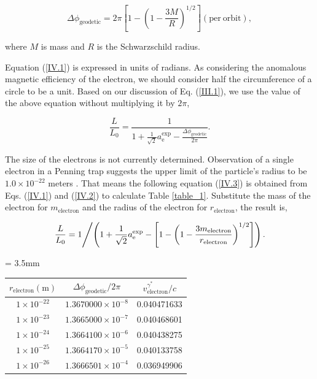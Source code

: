 \documentclass[10.5pt]{article}
\numberwithin{equation}{section}
\begin{document}
\begin{equation}
    \Delta \phi_{\mathrm{geodetic}} = 2 \pi \left[ 1 - \left( 1 - \frac{3M}{R} \right)^{1/2} \right] \mathrm{(per \ orbit)},
    \label{IV.1}
\end{equation}

\noindent where $M$ is mass and $R$ is the Schwarzschild radius.


Equation (\ref{IV.1}) is expressed in units of radians. As considering the anomalous magnetic efficiency of the electron, we should consider half the circumference of a circle to be a unit. Based on our discussion of Eq. (\ref{III.1}), we use the value of the above equation without multiplying it by $2 \pi$,

\begin{equation}
    \frac{L}{L_0} = \frac{1}{1 + \frac{1}{\sqrt{2}}a^{\text{exp}}_{\text{e}} - \frac{\Delta \phi_{\mathrm{geodetic}}}{2 \pi}} .
    \label{IV.2}
\end{equation}


The size of the electrons is not currently determined. Observation of a single electron in a Penning trap suggests the upper limit of the particle's radius to be $1.0 \times 10^{-22}$ meters \cite{Dehmelt}. That means the following equation (\ref{IV.3}) is obtained from Eqs. (\ref{IV.1}) and (\ref{IV.2}) to calculate Table \ref{table_1}.  Substitute the mass of the electron for $m_{\mathrm{electron}}$ and the radius of the electron for $r_{\mathrm{electron}}$, the result is,

\begin{equation}
    \left.
    \frac{L}{L_0} = 1
    \middle/
    \left( {1 + \frac{1}{\sqrt{2}}a^{\text{exp}}_{\text{e}} - \left[ 1 - \left( 1 - \frac{3 m_{\mathrm{electron}}}{r_{\mathrm{electron}}} \right)^{1/2} \right]} \right).
    \right.
    \label{IV.3}
\end{equation}

\begin{center}
    \begin{threeparttable}
        \caption{The velocity and the radius of an electron}
        \label{table_1}
        \tabcolsep = 3.5mm
        \renewcommand\arraystretch{1.2}
        \begin{tabular}{ccc}
            \hline
        $ r_{\mathrm{electron}} {\mathrm{(m)}}$ & $\Delta \phi_{\mathrm{geodetic}}/{2 \pi}$ & $ v_{\text{electron}}^{\gamma^{*}} / c$ \\       \hline
        $1 \times 10^{-22}$ & $1.3670000 \times 10^{-8}$ & 0.040471633 \\ 
        $1 \times 10^{-23}$ & $1.3665000 \times 10^{-7}$ & 0.040468601 \\ 
        $1 \times 10^{-24}$ & $1.3664100 \times 10^{-6}$ & 0.040438275 \\ 
        $1 \times 10^{-25}$ & $1.3664170 \times 10^{-5}$ & 0.040133758 \\ 
        $1 \times 10^{-26}$ & $1.3666501 \times 10^{-4}$ & 0.036949906 \\ 
            \hline
        \end{tabular}
    \end{threeparttable}
\end{center}
\end{document}
